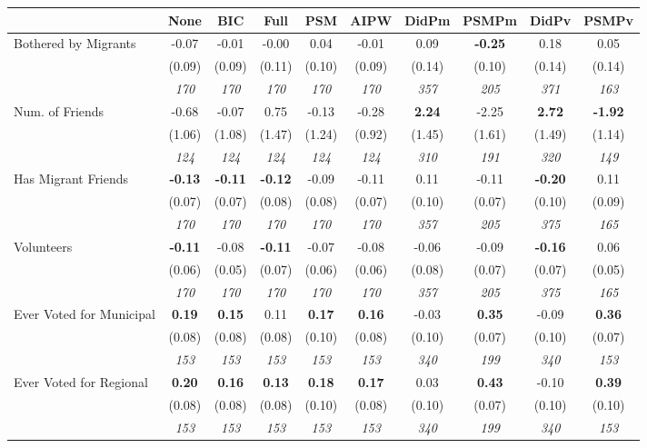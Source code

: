 \begin{tabular}{l c c c c c c c c c}
\toprule
 & None & BIC & Full & PSM & AIPW & DidPm & PSMPm & DidPv & PSMPv \\
\midrule
Bothered by Migrants & -0.07 & -0.01 & -0.00 & 0.04 & -0.01 & 0.09 & \textbf{-0.25} & 0.18 & 0.05 \\
& (0.09) & (0.09) & (0.11) & (0.10) & (0.09) & (0.14) & (0.10) & (0.14) & (0.14) \\
& \textit{ 170 } & \textit{ 170 } & \textit{ 170 } & \textit{ 170 } & \textit{ 170 } & \textit{ 357 } & \textit{ 205 } & \textit{ 371 } & \textit{ 163 } \\
Num. of Friends & -0.68 & -0.07 & 0.75 & -0.13 & -0.28 & \textbf{ 2.24 } & -2.25 & \textbf{ 2.72 } & \textbf{-1.92} \\
& (1.06) & (1.08) & (1.47) & (1.24) & (0.92) & (1.45) & (1.61) & (1.49) & (1.14) \\
& \textit{ 124 } & \textit{ 124 } & \textit{ 124 } & \textit{ 124 } & \textit{ 124 } & \textit{ 310 } & \textit{ 191 } & \textit{ 320 } & \textit{ 149 } \\
Has Migrant Friends & \textbf{ -0.13 } & \textbf{ -0.11 } & \textbf{ -0.12 } & -0.09 & -0.11 & 0.11 & -0.11 & \textbf{ -0.20 } & 0.11 \\
& (0.07) & (0.07) & (0.08) & (0.08) & (0.07) & (0.10) & (0.07) & (0.10) & (0.09) \\
& \textit{ 170 } & \textit{ 170 } & \textit{ 170 } & \textit{ 170 } & \textit{ 170 } & \textit{ 357 } & \textit{ 205 } & \textit{ 375 } & \textit{ 165 } \\
Volunteers & \textbf{ -0.11 } & -0.08 & \textbf{ -0.11 } & -0.07 & -0.08 & -0.06 & -0.09 & \textbf{ -0.16 } & 0.06 \\
& (0.06) & (0.05) & (0.07) & (0.06) & (0.06) & (0.08) & (0.07) & (0.07) & (0.05) \\
& \textit{ 170 } & \textit{ 170 } & \textit{ 170 } & \textit{ 170 } & \textit{ 170 } & \textit{ 357 } & \textit{ 205 } & \textit{ 375 } & \textit{ 165 } \\
Ever Voted for Municipal & \textbf{ 0.19 } & \textbf{ 0.15 } & 0.11 & \textbf{0.17} & \textbf{0.16} & -0.03 & \textbf{0.35} & -0.09 & \textbf{0.36} \\
& (0.08) & (0.08) & (0.08) & (0.10) & (0.08) & (0.10) & (0.07) & (0.10) & (0.07) \\
& \textit{ 153 } & \textit{ 153 } & \textit{ 153 } & \textit{ 153 } & \textit{ 153 } & \textit{ 340 } & \textit{ 199 } & \textit{ 340 } & \textit{ 153 } \\
Ever Voted for Regional & \textbf{ 0.20 } & \textbf{ 0.16 } & \textbf{ 0.13 } & \textbf{0.18} & \textbf{0.17} & 0.03 & \textbf{0.43} & -0.10 & \textbf{0.39} \\
& (0.08) & (0.08) & (0.08) & (0.10) & (0.08) & (0.10) & (0.07) & (0.10) & (0.10) \\
& \textit{ 153 } & \textit{ 153 } & \textit{ 153 } & \textit{ 153 } & \textit{ 153 } & \textit{ 340 } & \textit{ 199 } & \textit{ 340 } & \textit{ 153 } \\
\bottomrule
\end{tabular}
